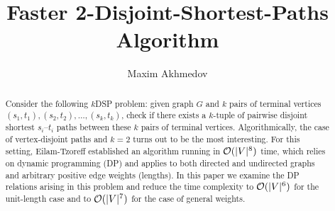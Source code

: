 \title{Faster 2-Disjoint-Shortest-Paths Algorithm}

\author{Maxim Akhmedov}


\maketitle

\begin{abstract}
Consider the following $k$DSP problem: given graph $G$ and $k$ pairs of terminal vertices $(s_1, t_1), (s_2, t_2), \ldots, (s_k, t_k)$, check if there exists a $k$-tuple of pairwise disjoint shortest $s_i$--$t_i$ paths between these $k$ pairs of terminal vertices. Algorithmically, the case of vertex-disjoint paths and $k=2$ turns out to be the most interesting. For this setting, Eilam-Tzoreff established an algorithm running in $\mathcal{O}(|V|^8)$ time, which relies on dynamic programming (DP) and applies to both directed and undirected graphs and arbitrary positive edge weights (lengths). In this paper we examine the DP relations arising in this problem and reduce the time complexity to $\mathcal{O}(|V|^6)$ for the unit-length case and to $\mathcal{O}(|V|^7)$ for the case of general weights.

\end{abstract}
